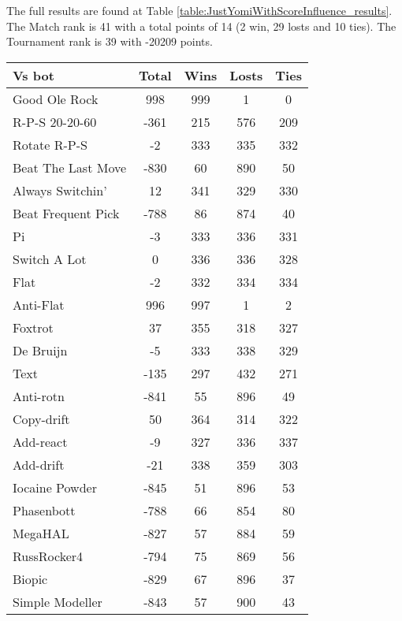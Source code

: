 The full results are found at Table \ref{table:JustYomiWithScoreInfluence_results}. The Match rank is 41 with a total points of 14 (2 win, 29 losts and 10 ties). The Tournament rank is 39 with -20209 points.

\begin{table*}
    \caption{Yomi - No Predictors, Score Influence results}
    \label{table:JustYomiWithScoreInfluence_results}
    \centering
    \begin{tabular}{|l|c|c|c|c|}
        \hline
        \textbf{Vs bot} & \textbf{Total} & \textbf{Wins} & \textbf{Losts} & \textbf{Ties} \\ \hline
Good Ole Rock & 998 & 999 & 1 & 0 \\ \hline 
R-P-S 20-20-60 & -361 & 215 & 576 & 209 \\ \hline 
Rotate R-P-S & -2 & 333 & 335 & 332 \\ \hline 
Beat The Last Move & -830 & 60 & 890 & 50 \\ \hline 
Always Switchin' & 12 & 341 & 329 & 330 \\ \hline 
Beat Frequent Pick & -788 & 86 & 874 & 40 \\ \hline 
Pi & -3 & 333 & 336 & 331 \\ \hline 
Switch A Lot & 0 & 336 & 336 & 328 \\ \hline 
Flat & -2 & 332 & 334 & 334 \\ \hline 
Anti-Flat & 996 & 997 & 1 & 2 \\ \hline 
Foxtrot & 37 & 355 & 318 & 327 \\ \hline 
De Bruijn & -5 & 333 & 338 & 329 \\ \hline 
Text & -135 & 297 & 432 & 271 \\ \hline 
Anti-rotn & -841 & 55 & 896 & 49 \\ \hline 
Copy-drift & 50 & 364 & 314 & 322 \\ \hline 
Add-react & -9 & 327 & 336 & 337 \\ \hline 
Add-drift & -21 & 338 & 359 & 303 \\ \hline 
Iocaine Powder & -845 & 51 & 896 & 53 \\ \hline 
Phasenbott & -788 & 66 & 854 & 80 \\ \hline 
MegaHAL & -827 & 57 & 884 & 59 \\ \hline 
RussRocker4 & -794 & 75 & 869 & 56 \\ \hline 
Biopic & -829 & 67 & 896 & 37 \\ \hline 
Simple Modeller & -843 & 57 & 900 & 43 \\ \hline 

\end{tabular}
\end{table*}
